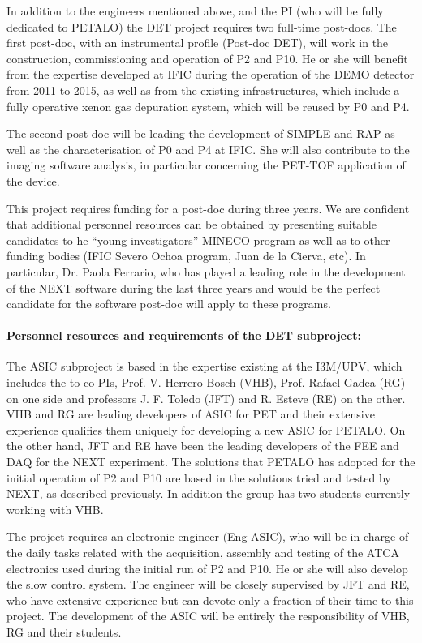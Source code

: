 In addition to the engineers mentioned above, and the PI (who will be fully dedicated to PETALO) the DET project requires two full-time post-docs. The first post-doc, with an instrumental profile (Post-doc DET), will work in the construction, commissioning and operation of P2 and P10. He or she will benefit from the expertise developed at IFIC during the operation of the DEMO detector from 2011 to 2015, as well as from the existing infrastructures, which include a fully operative xenon gas depuration system, which will be reused by P0 and P4. 

 The second post-doc will be leading the development of SIMPLE and RAP as well as the characterisation of P0 and P4 at IFIC. She will also contribute to the imaging software analysis, in particular concerning the PET-TOF application of the device.
 
This project requires funding for a post-doc during three years. We are confident that additional personnel resources can be obtained by presenting suitable candidates to he ``young investigators'' MINECO program as well as to other funding bodies (IFIC Severo Ochoa program, Juan de la Cierva, etc). In particular,  
Dr. Paola Ferrario, who has played a leading role in the development of the NEXT software during the last three years and would be the perfect candidate for the software post-doc will apply to these programs. 
 
 \paragraph{Personnel resources and requirements of the DET subproject:} 

The ASIC subproject is based in the expertise existing  at the I3M/UPV, which includes the to co-PIs, Prof. V. Herrero Bosch (VHB), Prof. Rafael Gadea (RG) on one side and professors J. F. Toledo (JFT) and R. Esteve (RE) on the other. VHB and RG are leading developers of ASIC for PET and their extensive experience qualifies them uniquely for developing a new ASIC for PETALO. On the other hand, JFT and RE have been the leading developers of the FEE and DAQ for the NEXT experiment. The solutions that PETALO has adopted for the initial operation of P2 and P10 are based in the solutions tried and tested by NEXT, as described previously. 
In addition the group has two students currently working with VHB.

The project requires an electronic engineer (Eng ASIC), who will be in charge of the daily tasks related with the acquisition, assembly and testing of the ATCA electronics used during the initial run of P2 and P10.  He or she will also develop the slow control system. The engineer will be closely supervised by JFT and RE, who have extensive experience but can devote only a fraction of their time to this project. The development of the ASIC will be entirely the responsibility of VHB, RG and their students. 

